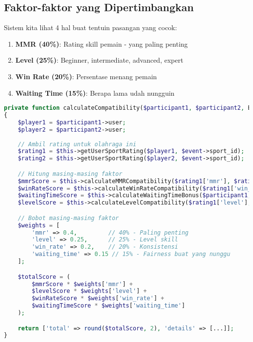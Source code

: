 \documentclass[12pt]{article}
\begin{document}
\subsection{Faktor-faktor yang Dipertimbangkan}

Sistem kita lihat 4 hal buat tentuin pasangan yang cocok:

\begin{enumerate}
    \item \textbf{MMR (40\%)}: Rating skill pemain - yang paling penting
    \item \textbf{Level (25\%)}: Beginner, intermediate, advanced, expert
    \item \textbf{Win Rate (20\%)}: Persentase menang pemain
    \item \textbf{Waiting Time (15\%)}: Berapa lama udah nungguin
\end{enumerate}

\begin{lstlisting}[language=PHP, caption=Calculation Compatibility Score]
private function calculateCompatibility($participant1, $participant2, Event $event)
{
    $player1 = $participant1->user;
    $player2 = $participant2->user;
    
    // Ambil rating untuk olahraga ini
    $rating1 = $this->getUserSportRating($player1, $event->sport_id);
    $rating2 = $this->getUserSportRating($player2, $event->sport_id);

    // Hitung masing-masing faktor
    $mmrScore = $this->calculateMMRCompatibility($rating1['mmr'], $rating2['mmr']);
    $winRateScore = $this->calculateWinRateCompatibility($rating1['win_rate'], $rating2['win_rate']);
    $waitingTimeScore = $this->calculateWaitingTimeBonus($participant1, $participant2);
    $levelScore = $this->calculateLevelCompatibility($rating1['level'], $rating2['level']);

    // Bobot masing-masing faktor
    $weights = [
        'mmr' => 0.4,         // 40% - Paling penting
        'level' => 0.25,      // 25% - Level skill
        'win_rate' => 0.2,    // 20% - Konsistensi
        'waiting_time' => 0.15 // 15% - Fairness buat yang nunggu
    ];

    $totalScore = (
        $mmrScore * $weights['mmr'] +
        $levelScore * $weights['level'] +
        $winRateScore * $weights['win_rate'] +
        $waitingTimeScore * $weights['waiting_time']
    );

    return ['total' => round($totalScore, 2), 'details' => [...]];
}
\end{lstlisting}
\end{document}
